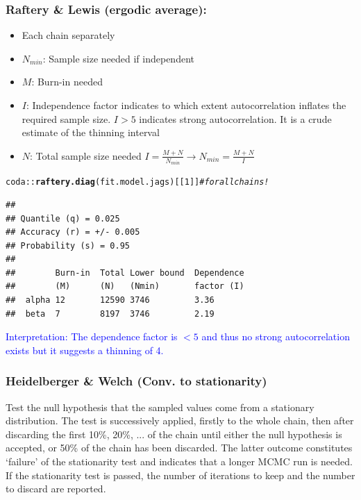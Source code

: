 \documentclass{article}\usepackage[]{graphicx}\usepackage[]{xcolor}
\makeatletter
\newcommand{\hlnum}[1]{\textcolor[rgb]{0.686,0.059,0.569}{#1}}%
\newcommand{\hlcom}[1]{\textcolor[rgb]{0.678,0.584,0.686}{\textit{#1}}}%
\newcommand{\hlopt}[1]{\textcolor[rgb]{0,0,0}{#1}}%
\newcommand{\hlstd}[1]{\textcolor[rgb]{0.345,0.345,0.345}{#1}}%
\newcommand{\hlkwd}[1]{\textcolor[rgb]{0.737,0.353,0.396}{\textbf{#1}}}%
\newenvironment{kframe}{%
 \def\at@end@of@kframe{}%
 \ifinner\ifhmode%
  \def\at@end@of@kframe{\end{minipage}}%
  \begin{minipage}{\columnwidth}%
 \fi\fi%
 \def\FrameCommand##1{\hskip\@totalleftmargin \hskip-\fboxsep
 \colorbox{shadecolor}{##1}\hskip-\fboxsep
     \hskip-\linewidth \hskip-\@totalleftmargin \hskip\columnwidth}%
 \MakeFramed {\advance\hsize-\width
   \@totalleftmargin\z@ \linewidth\hsize
   \@setminipage}}%
 {\par\unskip\endMakeFramed%
 \at@end@of@kframe}
\newenvironment{knitrout}{}{} %
\makeatother
\begin{document}
\begin{multicols*}{2}
\subsubsection{Raftery \& Lewis (ergodic average):}
\begin{itemize}
\item Each chain separately
\item $N_{min}$: Sample size needed if independent
\item $M$: Burn-in needed
\item $I$: Independence factor indicates to which extent autocorrelation inflates the required sample size. $I>5$ indicates strong autocorrelation. It is a crude estimate of the thinning interval
\item $N$: Total sample size needed $I=\frac{M+N}{N_{min}}\rightarrow N_{min}=\frac{M+N}{I}$
\end{itemize}
\tiny
\begin{knitrout}
\color{fgcolor}\begin{kframe}
\begin{alltt}
\hlstd{coda}\hlopt{::}\hlkwd{raftery.diag}\hlstd{(fit.model.jags)[[}\hlnum{1}\hlstd{]]}\hlcom{#for all chains!}
\end{alltt}
\begin{verbatim}
## 
## Quantile (q) = 0.025
## Accuracy (r) = +/- 0.005
## Probability (s) = 0.95 
##                                              
##        Burn-in  Total Lower bound  Dependence
##        (M)      (N)   (Nmin)       factor (I)
##  alpha 12       12590 3746         3.36      
##  beta  7        8197  3746         2.19
\end{verbatim}
\end{kframe}
\end{knitrout}
\footnotesize
\textcolor{blue}{Interpretation: The dependence factor is $<5$ and thus no strong autocorrelation exists but it suggests a thinning of 4.}

\subsubsection{Heidelberger \& Welch (Conv. to stationarity)}

Test the null hypothesis that the sampled values come from a stationary distribution. The test is successively applied, firstly to the whole chain, then after discarding the first 10\%, 20\%, ... of the chain until either the null hypothesis is accepted, or 50\% of the chain has been discarded. The latter outcome constitutes ‘failure’ of the stationarity test and indicates that a longer MCMC run is needed. If the stationarity test is passed, the number of iterations to keep and the number to discard are reported.


\end{multicols*}
\end{document}
